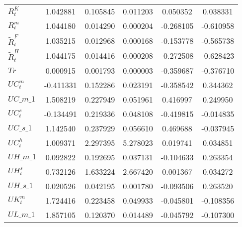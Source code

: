 \begin{center}
\begin{longtable}{lccccc}
$  R^K_t                    $	 & 	        1.042881	 & 	        0.105845	 & 	        0.011203	 & 	        0.050352	 & 	        0.038331 \\ 
$  R^m_t                    $	 & 	        1.044180	 & 	        0.014290	 & 	        0.000204	 & 	       -0.268105	 & 	       -0.610958 \\ 
$  \tilde{R}^F_t            $	 & 	        1.035215	 & 	        0.012968	 & 	        0.000168	 & 	       -0.153778	 & 	       -0.565738 \\ 
$  \tilde{R}^H_t            $	 & 	        1.044175	 & 	        0.014416	 & 	        0.000208	 & 	       -0.272508	 & 	       -0.628423 \\ 
$ Tr                        $	 & 	        0.000915	 & 	        0.001793	 & 	        0.000003	 & 	       -0.359687	 & 	       -0.376710 \\ 
$ UC^m_t                    $	 & 	       -0.411331	 & 	        0.152286	 & 	        0.023191	 & 	       -0.358542	 & 	        0.344362 \\ 
$UC\_m\_1                   $	 & 	        1.508219	 & 	        0.227949	 & 	        0.051961	 & 	        0.416997	 & 	        0.249950 \\ 
$ UC^s_t                    $	 & 	       -0.134491	 & 	        0.219336	 & 	        0.048108	 & 	       -0.419815	 & 	       -0.014835 \\ 
$UC\_s\_1                   $	 & 	        1.142540	 & 	        0.237929	 & 	        0.056610	 & 	        0.469688	 & 	       -0.037945 \\ 
$ UC^h_t                    $	 & 	        1.009371	 & 	        2.297395	 & 	        5.278023	 & 	        0.019741	 & 	        0.034851 \\ 
$UH\_m\_1                   $	 & 	        0.092822	 & 	        0.192695	 & 	        0.037131	 & 	       -0.104633	 & 	        0.263354 \\ 
$  UH^s_t                   $	 & 	        0.732126	 & 	        1.633224	 & 	        2.667420	 & 	        0.001367	 & 	        0.034272 \\ 
$UH\_s\_1                   $	 & 	        0.020526	 & 	        0.042195	 & 	        0.001780	 & 	       -0.093506	 & 	        0.263520 \\ 
$  UK^m_t                   $	 & 	        1.724416	 & 	        0.223458	 & 	        0.049933	 & 	       -0.045801	 & 	       -0.108356 \\ 
$UL\_m\_1                   $	 & 	        1.857105	 & 	        0.120370	 & 	        0.014489	 & 	       -0.045792	 & 	       -0.107300 \\ 

\end{longtable}
\end{center}
